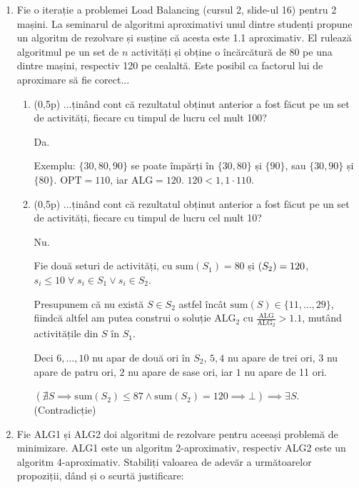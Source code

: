 \documentclass[a4paper,12pt]{article}
\newcommand*{\OPT}{\text{OPT}}
\newcommand*{\ALG}{\text{ALG}}
\begin{document}
\begin{enumerate}

\item
Fie o iterație a problemei Load Balancing (cursul 2, slide-ul 16) pentru 2 mașini.
La seminarul de algoritmi aproximativi unul dintre studenți
propune un algoritm de rezolvare și susține că acesta este 1.1
aproximativ. El rulează algoritmul pe un set de $n$ activități și obține o
încărcătură de 80 pe una dintre mașini, respectiv 120 pe cealaltă. Este
posibil ca factorul lui de aproximare să fie corect...

\begin{enumerate}

\item (0,5p)
...ținând cont că rezultatul obținut anterior a fost făcut pe un set de
activități, fiecare cu timpul de lucru cel mult 100?

Da.

Exemplu:
$\{30, 80, 90\}$ se poate împărți în $\{30, 80\}$ și $\{90\}$, sau $\{30, 90\}$ și $\{80\}$.
$\OPT = 110$, iar $\ALG = 120$. $120 < 1,1 \cdot 110$.

\item (0,5p)
...ținând cont că rezultatul obținut anterior a fost făcut pe un set de
activități, fiecare cu timpul de lucru cel mult 10?

Nu.

Fie două seturi de activități, cu $\text{sum}(S_1) = 80$ și $\text(S_2) = 120$,
$s_i \leq 10 \;\forall\; s_i \in S_1 \lor s_i \in S_2$.

Presupunem că nu există $S \in S_2$ astfel încât $\text{sum}(S) \in \{11, \dots, 29\}$,
fiindcă altfel am putea construi o soluție $\ALG_2$ cu $\frac{\ALG}{\ALG_2} > 1.1$,
mutând activitățile din $S$ în $S_1$.

Deci $6, \dots, 10$ nu apar de două ori în $S_2$, $5, 4$ nu apare de trei ori,
$3$ nu apare de patru ori, $2$ nu apare de sase ori, iar $1$ nu apare de 11 ori.

$\left(\nexists S \implies \text{sum}(S_2) \leq 87 \land \text{sum}(S_2) = 120 \implies \bot\right)
\implies \exists S$. (Contradicție)

\end{enumerate}

\item
Fie ALG1 și ALG2 doi algoritmi de rezolvare pentru aceeași problemă
de minimizare. ALG1 este un algoritm 2-aproximativ, respectiv
ALG2 este un algoritm 4-aproximativ. Stabiliți valoarea de adevăr a
următoarelor propoziții, dând și o scurtă justificare:


\end{enumerate}
\end{document}
